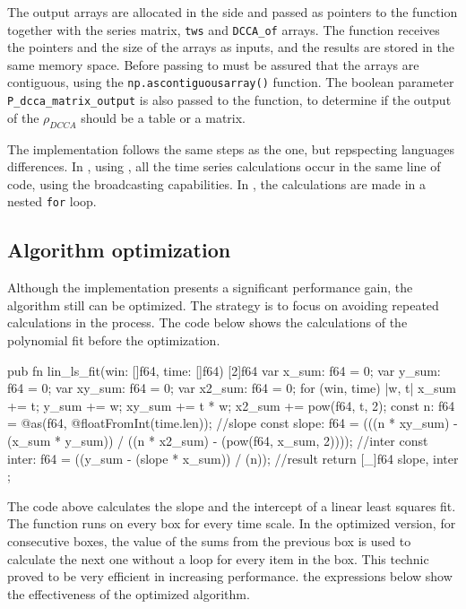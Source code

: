 \documentclass[article]{jss}
\begin{document}
The output arrays are allocated in the  side and passed as pointers to the  function together with the series matrix, \verb"tws" and \verb"DCCA_of" arrays. The  function receives the pointers and the size of the arrays as inputs, and the results are stored in the same memory space. Before passing to  must be assured that the arrays are contiguous, using the \verb"np.ascontiguousarray()" function. The boolean parameter \verb"P_dcca_matrix_output" is also passed to the  function, to determine if the output of the $\rho_{DCCA}$ should be a table or a matrix.

The  implementation follows the same steps as the  one, but repspecting languages differences. In , using , all the time series calculations occur in the same line of code, using the  broadcasting capabilities. In , the calculations are made in a nested \verb"for" loop.

\subsection{Algorithm optimization}

Although the  implementation presents a significant performance gain, the algorithm still can be optimized. The strategy is to focus on avoiding repeated calculations in the process. The code below shows the calculations of the polynomial fit before the optimization.

\begin{Code}
  pub fn lin_ls_fit(win: []f64, time: []f64) [2]f64 {
    var x_sum: f64 = 0;
    var y_sum: f64 = 0;
    var xy_sum: f64 = 0;
    var x2_sum: f64 = 0;
    for (win, time) |w, t| {
        x_sum += t;
        y_sum += w;
        xy_sum += t * w;
        x2_sum += pow(f64, t, 2);
    }
    const n: f64 = @as(f64, @floatFromInt(time.len));
    //slope
    const slope: f64 = (((n * xy_sum) - (x_sum * y_sum)) /
        ((n * x2_sum) - (pow(f64, x_sum, 2))));
    //inter
    const inter: f64 = ((y_sum - (slope * x_sum)) /
        (n));
    //result
    return [_]f64{ slope, inter };
}
\end{Code}

The code above calculates the slope and the intercept of a linear least squares fit. The function runs on every box for every time scale. In the optimized version, for consecutive boxes, the value of the sums from the previous box is used to calculate the next one without a loop for every item in the box. This technic proved to be very efficient in increasing performance. the expressions below show the effectiveness of the optimized algorithm.
\end{document}
